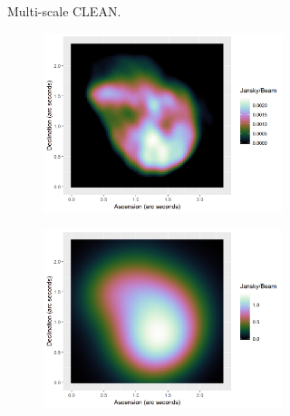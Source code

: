 \begin{figure}[!ht]
\begin{subfigure}[b]{1.0\linewidth}
\begin{subfigure}{0.40\linewidth}
		\end{subfigure}
		\caption{Multi-scale CLEAN.}
	\end{subfigure}
	\begin{subfigure}[b]{1.0\linewidth}
		\centering
		\begin{subfigure}{0.40\linewidth}
			\includegraphics[width=1.00\linewidth]{./chapters/10.results/SerialCD/CD-N132.png}
		\end{subfigure}
		\begin{subfigure}{0.40\linewidth}
			\includegraphics[width=1.00\linewidth]{./chapters/10.results/SerialCD/CD-image-N132.png}
		\end{subfigure}
		

\end{subfigure}
\end{figure}
